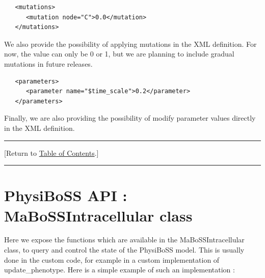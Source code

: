 \documentclass[12pt]{article}
\newcommand{\TOClink}{\begin{center}\hrule\vskip-5pt\phantom{.}\hfill[Return to \hyperlink{TOC}{Table of Contents}.]\hfill\phantom{.}\vskip3pt\hrule\end{center}}
\begin{document}
\begin{verbatim}
   <mutations>
      <mutation node="C">0.0</mutation>
   </mutations>
\end{verbatim}
We also provide the possibility of applying mutations in the XML definition. For now, the value can only be 0 or 1, but we are planning to include gradual mutations in future releases. 

\begin{verbatim}
   <parameters>
      <parameter name="$time_scale">0.2</parameter>
   </parameters>
\end{verbatim}
Finally, we are also providing the possibility of modify parameter values directly in the XML definition. 
\TOClink

\section{PhysiBoSS API : MaBoSSIntracellular class}
\label{sec:physiboss_api}
%

Here we expose the functions which are available in the MaBoSSIntracellular class, to query and control the state of the PhysiBoSS model. This is usually done in the custom code, for example in a custom implementation of update\_phenotype. Here is a simple example of such an implementation : 
\end{document}

